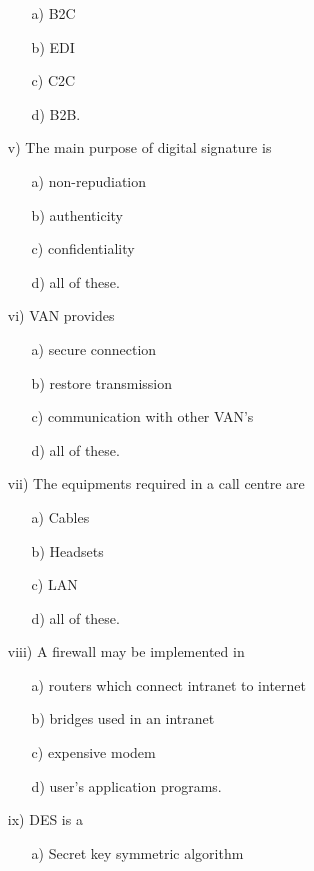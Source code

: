 \documentclass{article}
\begin{document}
\begin{enumerate}
    \begin{enumerate}
        \item[a)] B2C
        \item[b)] EDI
        \item[c)] C2C
        \item[d)] B2B.
    \end{enumerate}
    \item[v)] The main purpose of digital signature is
    \begin{enumerate}
        \item[a)] non-repudiation
        \item[b)] authenticity
        \item[c)] confidentiality
        \item[d)] all of these.
    \end{enumerate}
    \item[vi)] VAN provides
    \begin{enumerate}
        \item[a)] secure connection
        \item[b)] restore transmission
        \item[c)] communication with other VAN's
        \item[d)] all of these.
    \end{enumerate}
    \item[vii)] The equipments required in a call centre are
    \begin{enumerate}
        \item[a)] Cables
        \item[b)] Headsets
        \item[c)] LAN
        \item[d)] all of these.
    \end{enumerate}
    \item[viii)] A firewall may be implemented in
    \begin{enumerate}
        \item[a)] routers which connect intranet to internet
        \item[b)] bridges used in an intranet
        \item[c)] expensive modem
        \item[d)] user's application programs.
    \end{enumerate}
    \item[ix)] DES is a
    \begin{enumerate}
        \item[a)] Secret key symmetric algorithm

\end{enumerate}
\end{enumerate}
\end{document}
